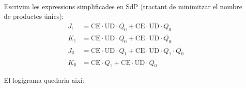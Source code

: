 Escrivim les expressions simplificades en SdP (tractant de minimitzar el nombre de productes únics):
%
\begin{align*}
  J_1 &=
    \text{CE} \cdot \text{UD} \cdot \overline{Q_0} +
    \text{CE} \cdot \overline{\text{UD}} \cdot Q_0
  \\
  K_1 &=
    \text{CE} \cdot \text{UD} \cdot Q_0 +
    \text{CE} \cdot \overline{\text{UD}} \cdot \overline{Q_0}
  \\
  J_0 &=
    \text{CE} \cdot \text{UD} \cdot Q_1 +
    \text{CE} \cdot \overline{\text{UD}} \cdot \overline{Q_1} \cdot \overline{Q_0}
  \\
  K_0 &=
    \text{CE} \cdot \overline{Q_1} +
    \text{CE} \cdot \overline{\text{UD}} \cdot Q_0
\end{align*}

\finishpage
\startpage

El logigrama quedaria així: 

